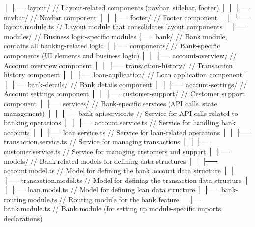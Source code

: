 │   ├── layout/                          // Layout-related components (navbar, sidebar, footer)
│   │   ├── navbar/                      // Navbar component
│   │   ├── footer/                      // Footer component
│   │   └── layout.module.ts             // Layout module that consolidates layout components
│   ├── modules/                         // Business logic-specific modules
        ├── bank/                              // Bank module, contains all banking-related logic
            │   ├── components/                    // Bank-specific components (UI elements and business logic)
            │   │   ├── account-overview/          // Account overview component
            │   │   ├── transaction-history/       // Transaction history component
            │   │   ├── loan-application/          // Loan application component
            │   │   ├── bank-details/              // Bank details component
            │   │   ├── account-settings/          // Account settings component
            │   │   ├── customer-support/          // Customer support component
            │   ├── services/                      // Bank-specific services (API calls, state management)
            │   │   ├── bank-api.service.ts        // Service for API calls related to banking operations
            │   │   ├── account.service.ts         // Service for handling bank accounts
            │   │   ├── loan.service.ts            // Service for loan-related operations
            │   │   ├── transaction.service.ts     // Service for managing transactions
            │   │   ├── customer.service.ts        // Service for managing customers and support
            │   ├── models/                        // Bank-related models for defining data structures
            │   │   ├── account.model.ts           // Model for defining the bank account data structure
            │   │   ├── transaction.model.ts       // Model for defining the transaction data structure
            │   │   ├── loan.model.ts              // Model for defining loan data structure
            │   ├── bank-routing.module.ts         // Routing module for the bank feature
            │   ├── bank.module.ts                 // Bank module (for setting up module-specific imports, declarations)


